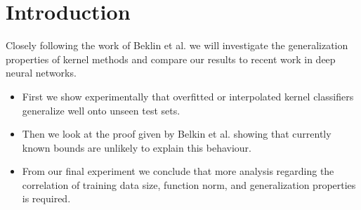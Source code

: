\section{Introduction}

Closely following the work of Beklin et al. \cite{belkin2018a} we will investigate the generalization properties of kernel methods and compare our results to recent work in deep neural networks.

\begin{itemize}
    \item First we show experimentally that overfitted or interpolated kernel classifiers generalize well onto unseen test sets.
    \item Then we look at the proof given by Belkin et al. showing that currently known bounds are unlikely to explain this behaviour.
    \item From our final experiment we conclude that more analysis regarding the correlation of training data size, function norm, and generalization properties is required.
\end{itemize}



